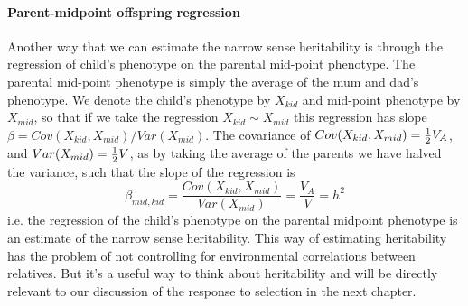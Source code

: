 \paragraph{Parent-midpoint offspring regression} 
Another way that we can estimate the narrow sense heritability is
through the regression of child's phenotype on the parental mid-point
phenotype. The parental mid-point phenotype is simply the average of
the mum and dad's phenotype. We denote the child's phenotype by $X_{kid}$ and mid-point
phenotype by $X_{mid}$, so that if we take the regression $X_{kid} \sim X_{mid}$ this
regression has slope $\beta = Cov(X_{kid},X_{mid})/Var(X_{mid})$.
The covariance of $Cov(X_{kid},X_{mid})=\tfrac{1}{2}
V_A$, and $Var(X_{mid}) = \tfrac{1}{2} V$, as by taking the average of the
parents we have halved the variance, such that the slope of the
regression is
\begin{equation}
\beta_{mid,kid}= \frac{Cov(X_{kid},X_{mid})}{Var(X_{mid})} = \frac{V_A}{V} = h^2
\end{equation}
i.e. the regression of the child's phenotype on the parental midpoint
phenotype is an estimate of the narrow sense heritability. This way of estimating heritability has the problem of not controlling for environmental correlations between relatives. But it's a useful way to think about heritability and will be directly relevant to our discussion of the response to selection in the next chapter.\\

